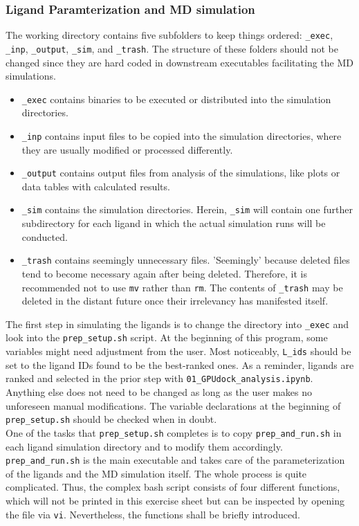 \documentclass[9pt,tutorial]{livecoms}
\newcommand{\code}[1]{\colorbox{light-gray}{\texttt{#1}}}
\begin{document}
\subsubsection*{Ligand Paramterization and MD simulation}
The working directory contains five subfolders to keep things ordered: \code{\_exec}, \code{\_inp}, \code{\_output}, \code{\_sim}, and \code{\_trash}. The structure of these folders should not be changed since they are hard coded in downstream executables facilitating the MD simulations. 
\begin{itemize}
    \item \code{\_exec} contains binaries to be executed or distributed into the simulation directories.
    \item \code{\_inp} contains input files to be copied into the simulation directories, where they are usually modified or processed differently.
    \item \code{\_output} contains output files from analysis of the simulations, like plots or data tables with calculated results.
    \item \code{\_sim} contains the simulation directories. Herein, \code{\_sim} will contain one further subdirectory for each ligand in which the actual simulation runs will be conducted.
    \item \code{\_trash} contains seemingly unnecessary files. 'Seemingly' because deleted files tend to become necessary again after being deleted. Therefore, it is recommended not to use \code{mv} rather than \code{rm}. The contents of \code{\_trash} may be deleted in the distant future once their irrelevancy has manifested itself. 
\end{itemize}
The first step in simulating the ligands is to change the directory into \code{\_exec} and look into the \code{prep\_setup.sh} script. At the beginning of this program, some variables might need adjustment from the user. Most noticeably, \code{L\_ids} should be set to the ligand IDs found to be the best-ranked ones. As a reminder, ligands are ranked and selected in the prior step with \code{01\_GPUdock\_analysis.ipynb}. Anything else does not need to be changed as long as the user makes no unforeseen manual modifications. The variable declarations at the beginning of \code{prep\_setup.sh} should be checked when in doubt.\\ 
One of the tasks that \code{prep\_setup.sh} completes is to copy \code{prep\_and\_run.sh} in each ligand simulation directory and to modify them accordingly. \code{prep\_and\_run.sh} is the main executable and takes care of the parameterization of the ligands and the MD simulation itself. The whole process is quite complicated. Thus, the complex bash script consists of four different functions, which will not be printed in this exercise sheet but can be inspected by opening the file via \code{vi}. Nevertheless, the functions shall be briefly introduced.\\
\end{document}
